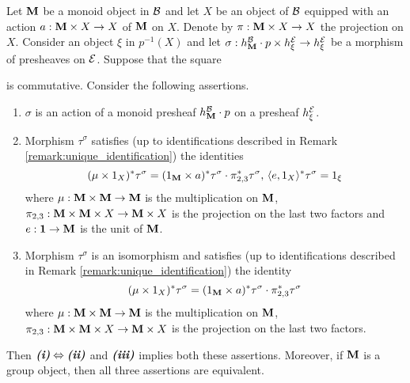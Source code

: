 \begin{proposition}\label{proposition:equivalent_description_of_equivariance_in_representable_case}
Let $\mathbf{M}$ be a monoid object in ${\mathcal B}$ and let $X$ be an object of ${\mathcal B}$ equipped with an action $a:\mathbf{M}\times X\rightarrow X$ of $\mathbf{M}$ on $X$. Denote by $\pi:\mathbf{M}\times X\rightarrow X$ the projection on $X$. Consider an object $\xi$ in $p^{-1}(X)$ and let $\sigma:h^{{\mathcal B}}_{\mathbf{M}} \cdot p \times h^{{\mathcal E}}_{\xi}\rightarrow h^{{\mathcal E}}_{\xi}$ be a morphism of presheaves on ${\mathcal E}$. Suppose that the square
\begin{center}
\end{center}
is commutative. Consider the following assertions.
\begin{enumerate}[label= \emph{\textbf{(\roman*)}}, leftmargin=3.0em]
\item $\sigma$ is an action of a monoid presheaf $h^{{\mathcal B}}_{\mathbf{M}}\cdot p$ on a presheaf $h^{{\mathcal E}}_{\xi}$.
\item Morphism $\tau^{\sigma}$ satisfies (up to identifications described in Remark \ref{remark:unique_identification}) the identities
$$(\mu \times 1_X)^*\tau^{\sigma} = (1_{\mathbf{M}} \times  a)^*\tau^{\sigma} \cdot \pi_{2,3}^*\tau^{\sigma},\,\langle e, 1_{X} \rangle^*\tau^{\sigma} = 1_{\xi}$$
where $\mu: \mathbf{M} \times \mathbf{M} \rightarrow \mathbf{M}$ is the multiplication on $\mathbf{M}$, $\pi_{2,3}:\mathbf{M}\times  \mathbf{M} \times  X \rightarrow \mathbf{M} \times X$ is the projection on the last two factors and $e:\mathbf{1}\rightarrow \mathbf{M}$ is the unit of $\mathbf{M}$.
\item Morphism $\tau^{\sigma}$ is an isomorphism and satisfies (up to identifications described in Remark \ref{remark:unique_identification}) the identity
$$(\mu \times 1_X)^*\tau^{\sigma} = (1_{\mathbf{M}} \times  a)^*\tau^{\sigma} \cdot \pi_{2,3}^*\tau^{\sigma}$$
where $\mu: \mathbf{M} \times \mathbf{M} \rightarrow \mathbf{M}$ is the multiplication on $\mathbf{M}$, $\pi_{2,3}:\mathbf{M}\times  \mathbf{M} \times  X \rightarrow \mathbf{M} \times X$ is the projection on the last two factors.
\end{enumerate}
Then $\textbf{\emph{(i)}}\Leftrightarrow \textbf{\emph{(ii)}}$ and $\textbf{\emph{(iii)}}$ implies both these assertions. Moreover, if $\mathbf{M}$ is a group object, then all three assertions are equivalent.
\end{proposition}
